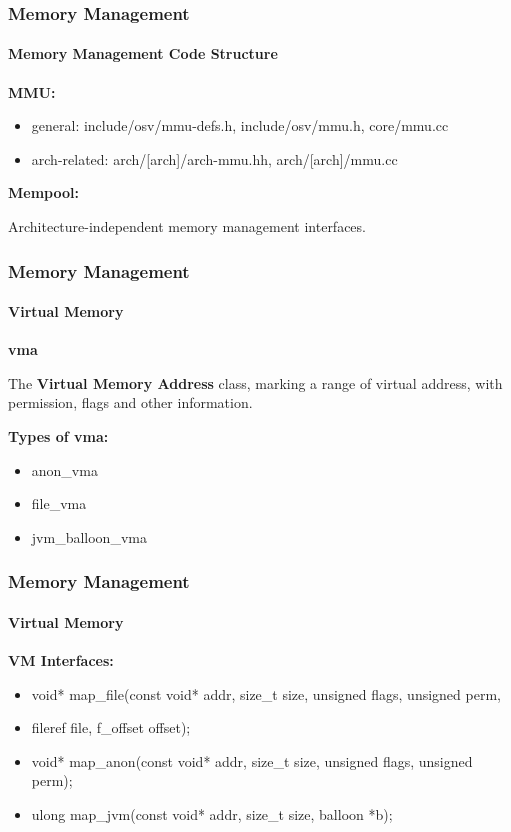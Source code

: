 \documentclass[10pt]{beamer}
\begin{document}
\begin{frame}
	\frametitle{Memory Management}
	\framesubtitle{Memory Management Code Structure}
	
	\textbf{MMU: }
	\begin{itemize}
		\item general: include/osv/mmu-defs.h, include/osv/mmu.h, core/mmu.cc
		\item arch-related: arch/[arch]/arch-mmu.hh, arch/[arch]/mmu.cc
	\end{itemize}
	
	\smallskip
	
	\textbf{Mempool: }
	
	Architecture-independent memory management interfaces.
	
\end{frame}


\begin{frame}
	\frametitle{Memory Management}
	\framesubtitle{Virtual Memory}
	
	\textbf{vma}
	
	The \textbf{Virtual Memory Address} class, marking a 	range of virtual address, with permission, flags and other information.
	
	\textbf{Types of vma: }
	\begin{itemize}
		\item anon\_vma
		\item file\_vma
		\item jvm\_balloon\_vma
	\end{itemize}

\end{frame}


\begin{frame}
	\frametitle{Memory Management}
	\framesubtitle{Virtual Memory}
	
	\textbf{VM Interfaces: }
	\begin{itemize}
		\item void* map\_file(const void* addr, size\_t size, unsigned flags, unsigned perm,
		\item fileref file, f\_offset offset);
		\item void* map\_anon(const void* addr, size\_t size, unsigned flags, unsigned perm);
		\item ulong map\_jvm(const void* addr, size\_t size, balloon *b);
	\end{itemize}
\end{frame}
\end{document}
